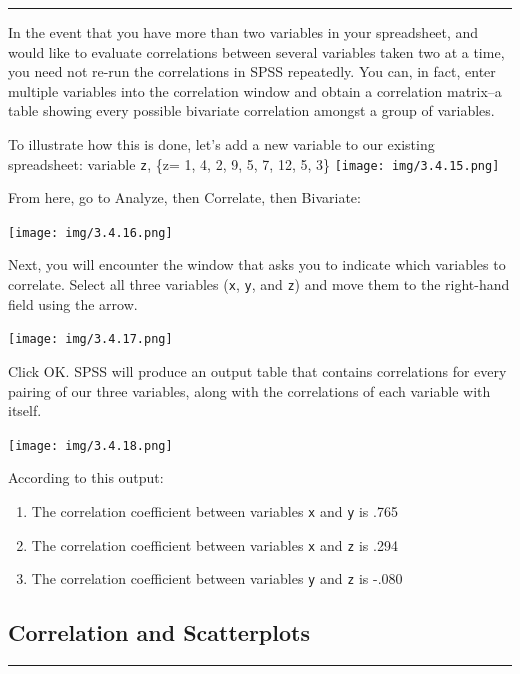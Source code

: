 \documentclass[]{book}
\providecommand{\tightlist}{%
  \setlength{\itemsep}{0pt}\setlength{\parskip}{0pt}}
\begin{document}
\begin{center}\rule{0.5\linewidth}{0.5pt}\end{center}

In the event that you have more than two variables in your spreadsheet,
and would like to evaluate correlations between several variables taken
two at a time, you need not re-run the correlations in SPSS repeatedly.
You can, in fact, enter multiple variables into the correlation window
and obtain a correlation matrix--a table showing every possible
bivariate correlation amongst a group of variables.

To illustrate how this is done, let's add a new variable to our existing
spreadsheet: variable \texttt{z}, \{z= 1, 4, 2, 9, 5, 7, 12, 5, 3\}
\texttt{[image: img/3.4.15.png]}

From here, go to {Analyze}, then {Correlate}, then {Bivariate}:

\texttt{[image: img/3.4.16.png]}

Next, you will encounter the window that asks you to indicate which
variables to correlate. Select all three variables (\texttt{x},
\texttt{y}, and \texttt{z}) and move them to the right-hand field using
the arrow.

\texttt{[image: img/3.4.17.png]}

Click {OK}. SPSS will produce an output table that contains correlations
for every pairing of our three variables, along with the correlations of
each variable with itself.

\texttt{[image: img/3.4.18.png]}

According to this output:

\begin{enumerate}
\def\labelenumi{\arabic{enumi}.}
\tightlist
\item
  The correlation coefficient between variables \texttt{x} and
  \texttt{y} is .765
\item
  The correlation coefficient between variables \texttt{x} and
  \texttt{z} is .294
\item
  The correlation coefficient between variables \texttt{y} and
  \texttt{z} is -.080
\end{enumerate}

\subsection{Correlation and
Scatterplots}\label{correlation-and-scatterplots}

\begin{center}\rule{0.5\linewidth}{0.5pt}\end{center}
\end{document}
